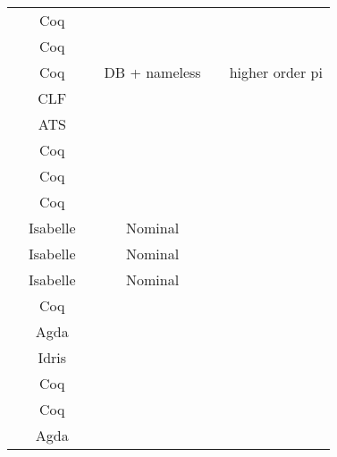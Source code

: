 \begin{center}
\begin{tabular}{l|c|c|c|c|l}
  \cite{Zalakain2019}                & Coq                    &           &         &             &             \\
  \cite{Petz2016}                    & Coq                    &           &         &             &             \\
    \cite{AmbalLS21}                    & Coq                    &           & DB + nameless         &             &      higher order pi       \\
  \cite{Bock2016}                    & CLF                    &           &         &             &             \\
  \cite{Xi2016}                      & ATS                    &           &         &             &             \\
  \cite{Hirsch2022}                  & Coq                    &           &         &             &             \\
  \cite{Cruz-Filipe2021b}            & Coq                    &           &         &             &             \\
  \cite{Maksimovic2015}              & Coq                    &           &         &             &             \\
  \cite{Parrow2014}                  & Isabelle               &           & Nominal &             &             \\
  \cite{Bengtson2016}                & Isabelle               &           & Nominal &             &             \\
  \cite{Kahsai2008}                  & Isabelle               &           & Nominal &             &             \\
  \cite{Castro-Perez2021}            & Coq                    &           &         &             &             \\
  \cite{Gay2020}                     & Agda                   &           &         &             &             \\
  \cite{Brady2017}                   & Idris                  &           &         &             &             \\
  \cite{Hinrichsen2019}              & Coq                    &           &         &             &             \\
  \cite{Sergey2017}                  & Coq                    &           &         &             &             \\
  \cite{DBLP:conf/forte/ZalakainD21} & Agda                   &           &         &             & 
\end{tabular}
\end{center}

